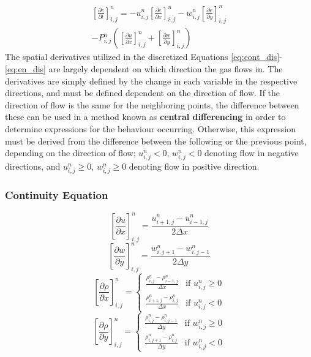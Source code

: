 \documentclass[10pt, nofootinbib, twocolumn]{revtex4-1}
\begin{document}
\begin{equation}\label{eq:en_dis}
\begin{split}
     \left[\frac{\partial e}{\partial t}\right]^{n}_{i,j} = 
     -u_{i,j}^n\left[\frac{\partial e}{\partial x}\right]^{n}_{i,j}
    -w_{i,j}^n\left[\frac{\partial e}{\partial y}\right]^{n}_{i,j}\\
    - P_{i,j}^n \left( \left[\frac{\partial u}{\partial x}\right]^{n}_{i,j} +  \left[\frac{\partial w}{\partial y}\right]^{n}_{i,j}  \right)
\end{split}
\end{equation}
The spatial derivatives utilized in the discretized Equations \eqref{eq:cont_dis}-\eqref{eq:en_dis} are largely dependent on which direction the gas flows in. The derivatives are simply defined by the change in each variable in the respective directions, and must be defined dependent on the direction of flow. If the direction of flow is the same for the neighboring points, the difference between these can be used in a method known as \textbf{central differencing} \cite{text} in order to determine expressions for the behaviour occurring. Otherwise, this expression must be derived from the difference between the following or the previous point, depending on the direction of flow; 
$ u_{i,j}^{n} < 0$, $ w_{i,j}^{n} < 0$ denoting flow in negative directions, and $u_{i,j}^{n} \geq 0$, $w_{i,j}^{n} \geq 0$ denoting flow in positive direction. 

\subsubsection{Continuity Equation}
$$\left[\frac{\partial u}{\partial x}\right]^{n}_{i,j} = \frac{u_{i+1,j}^{n}-u_{i-1,j}^{n}}{2\Delta x}$$
$$\left[\frac{\partial w}{\partial y}\right]^{n}_{i,j} = \frac{w_{i,j+1}^{n}-w_{i,j-1}^{n}}{2\Delta y}$$
\[\left[\frac{\partial \rho }{\partial x}\right]^{n}_{i,j} = 
\begin{cases}
\frac{\rho_{i,j}^{n}-\rho_{i-1,j}^{n}}{\Delta x} & \text{if } u_{i,j}^{n} \geq 0 \\
\frac{\rho_{i+1,j}^{n}-\rho_{i,j}^{n}}{\Delta x} & \text{if } u_{i,j}^{n} < 0
\end{cases}\]
\[\left[\frac{\partial \rho }{\partial y}\right]^{n}_{i,j} = 
\begin{cases}
\frac{\rho_{i,j}^{n}-\rho_{i,j-1}^{n}}{\Delta y} & \text{if } w_{i,j}^{n} \geq 0 \\
\frac{\rho_{i,j+1}^{n}-\rho_{i,j}^{n}}{\Delta y} & \text{if } w_{i,j}^{n} < 0
\end{cases}\]
\end{document}
